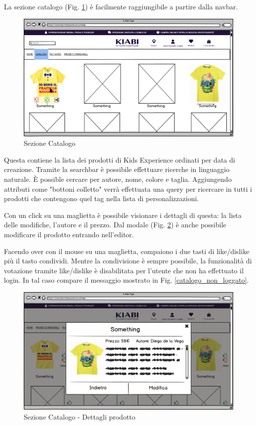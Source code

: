 \documentclass[12pt,italian,]{report}
\begin{document}
La sezione catalogo (Fig. \ref{catalogo}) è facilmente raggiungibile a partire dalla navbar.

\begin{figure}[h]
\centering
\includegraphics{balsamiq/Catalogo.png}
\caption{Sezione Catalogo}
\label{catalogo}
\end{figure}

Questa contiene la lista dei prodotti di Kids Experience ordinati per data di creazione. Tramite la searchbar è possibile effettuare ricerche in linguaggio naturale. È possible cercare per autore, nome, colore e taglia. Aggiungendo attributi come "bottoni colletto" verrà effettuata una query per ricercare in tutti i prodotti che contengono quel tag nella lista di personalizzazioni.

Con un click su una maglietta è possibile visionare i dettagli di questa: la lista delle modifiche, l'autore e il prezzo. Dal modale (Fig. \ref{catalogo_dettagli}) è anche possibile modificare il prodotto entrando nell'editor.

Facendo over con il mouse su una maglietta, compaiono i due tasti di like/dislike più il tasto condividi. Mentre la condivisione è sempre possibile, la funzionalità di votazione tramite like/dislike è disabilitata per l'utente che non ha effettuato il login. In tal caso compare il messaggio mostrato in Fig. \ref{catalogo_non_loggato}.

\begin{figure}[h]
\centering
\includegraphics{balsamiq/Catalogo details.png}
\caption{Sezione Catalogo - Dettagli prodotto}
\label{catalogo_dettagli}
\end{figure}
\end{document}
